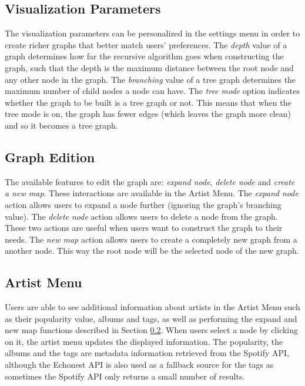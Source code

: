 \documentclass{article}
\begin{document}
    \subsection{Visualization Parameters}
    \label{sub:visualization_parameters}

      The visualization parameters can be personalized in the settings menu in order to create richer graphs that better match users' preferences.
      The \textit{depth} value of a graph determines how far the recursive algorithm goes when constructing the graph, such that the depth is the maximum distance between the root node and any other node in the graph.
      The \textit{branching} value of a tree graph determines the maximum number of child nodes a node can have.
      The \textit{tree mode} option indicates whether the graph to be built is a tree graph or not.
      This means that when the tree mode is on, the graph has fewer edges (which leaves the graph more clean) and so it becomes a tree graph.

    \subsection{Graph Edition}
    \label{sub:graph_edition}
      
      The available features to edit the graph are: \textit{expand node}, \textit{delete node} and \textit{create a new map}. These interactions are available in the Artist Menu.
      The \textit{expand node} action allows users to expand a node further (ignoring the graph's branching value).
      The \textit{delete node} action allows users to delete a node from the graph.
      These two actions are useful when users want to construct the graph to their needs.
      The \emph{new map} action allows users to create a completely new graph from a another node. This way the root node will be the selected node of the new graph.

    \subsection{Artist Menu}
    \label{sub:artist_menu}
    
      Users are able to see additional information about artists in the Artist Menu such as their popularity value, albums and tags, as well as performing the expand and new map functions described in Section \ref{sub:graph_edition}.
      When users select a node by clicking on it, the artist menu updates the displayed information.
      The popularity, the albums and the tags are metadata information retrieved from the Spotify API, although the Echonest API\cite{echonestdev} is also used as a fallback source for the tags  as sometimes the Spotify API only returns a small number of results.
\end{document}
